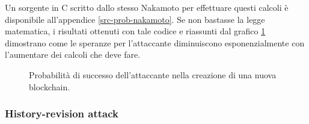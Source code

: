 Un sorgente in C scritto dallo stesso Nakamoto per effettuare questi calcoli è disponibile all'appendice \ref{src-prob-nakamoto}.
Se non bastasse la legge matematica, i risultati ottenuti con tale codice e riassunti dal grafico \ref{grafico-risultati-codice-nakamoto} dimostrano come le speranze per l'attaccante diminuiscono esponenzialmente con l'aumentare dei calcoli che deve fare.

\begin{figure}
  \caption{Probabilità di successo dell'attaccante nella creazione di una nuova blockchain.\label{grafico-risultati-codice-nakamoto}}
\end{figure}

\subsubsection{History-revision attack}\label{history-revision}

